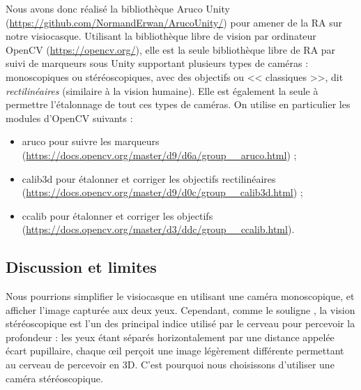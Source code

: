 Nous avons donc réalisé la bibliothèque Aruco Unity (\url{https://github.com/NormandErwan/ArucoUnity/}) pour amener de la RA sur notre visiocasque. Utilisant la bibliothèque libre de vision par ordinateur OpenCV (\url{https://opencv.org/}), elle est la seule bibliothèque libre de RA par suivi de marqueurs sous Unity supportant plusieurs types de caméras : monoscopiques ou stéréoscopiques, avec des objectifs  ou << classiques >>, dit \emph{rectilinéaires} (similaire à la vision humaine). Elle est également la seule à permettre l'étalonnage de tout ces types de caméras. On utilise en particulier les modules d'OpenCV suivants :
\begin{itemize}
  \item aruco pour suivre les marqueurs (\url{https://docs.opencv.org/master/d9/d6a/group__aruco.html}) ;
  \item calib3d pour étalonner et corriger les objectifs rectilinéaires (\url{https://docs.opencv.org/master/d9/d0c/group__calib3d.html}) ;
  \item ccalib pour étalonner et corriger les objectifs  (\url{https://docs.opencv.org/master/d3/ddc/group__ccalib.html}).
\end{itemize}


\subsection{Discussion et limites}
\label{subsec:solution_discusion}
Nous pourrions simplifier le visiocasque en utilisant une caméra monoscopique, et afficher l'image capturée aux deux yeux. Cependant, comme le souligne \cite{Bourke1999}, la vision stéréoscopique est l'un des principal indice utilisé par le cerveau pour percevoir la profondeur : les yeux étant séparés horizontalement par une distance appelée écart pupillaire, chaque \oe il perçoit une image légèrement différente  permettant au cerveau de percevoir en 3D. C'est pourquoi nous choisissons d'utiliser une caméra stéréoscopique.


